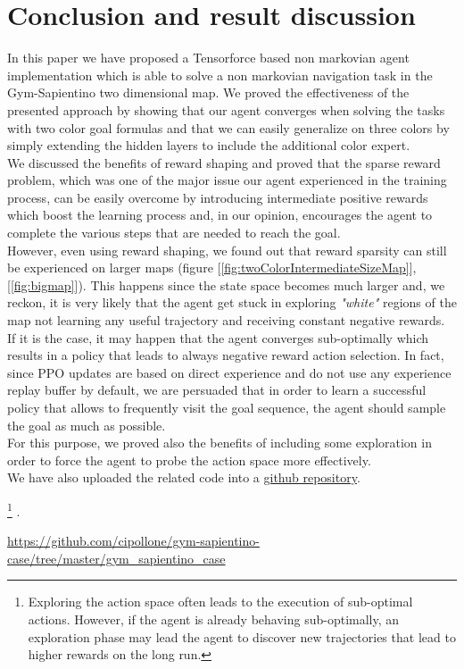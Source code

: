 \documentclass{article}
\begin{document}
\section{Conclusion and result discussion}
In this paper we have proposed a Tensorforce based non markovian agent implementation which is able to solve a non markovian navigation task in the Gym-Sapientino two dimensional map.
We proved the effectiveness of the presented approach by showing that our agent converges when solving the tasks with two color goal formulas and that we can easily generalize on three colors by simply extending the hidden layers to include the additional color expert. \\
We discussed the benefits of reward shaping and proved that the sparse reward problem, which was one of the major issue our agent experienced in the training process, can be easily overcome by introducing intermediate positive rewards which boost the learning process and, in our opinion, encourages the agent to complete the various steps that are needed to reach the goal.\\
However, even using reward shaping, we found out that reward sparsity can still be experienced on larger maps (figure [\ref{fig:twoColorIntermediateSizeMap}],[\ref{fig:bigmap}]). This happens since the state space becomes much larger and, we reckon, it is very likely that the agent get stuck in exploring \textit{"white"} regions of the map not learning any useful trajectory and receiving constant negative rewards. If it is the case, it may happen that the agent converges sub-optimally which results in a policy that leads to always negative reward action selection. In fact, since PPO updates are based on direct experience and do not use any experience replay buffer by default, we are persuaded that in order to learn a successful policy that allows to frequently visit the goal sequence, the agent should sample the goal as much as possible. \\
For this purpose, we proved also the benefits of including some exploration in order to force the agent to probe the action space more effectively.\\
We have also uploaded the related code into a \href{https://github.com/francycar/RA_project}{github repository}.



\footnote{Exploring the action space often leads to the  execution of sub-optimal actions. However, if the agent is already behaving sub-optimally, an exploration phase may lead the agent to discover new trajectories that lead to higher rewards on the long run.} .\\
















\begin{itemize}
\url{https://github.com/cipollone/gym-sapientino-case/tree/master/gym\_sapientino\_case}{}

\end{itemize}
\end{document}
